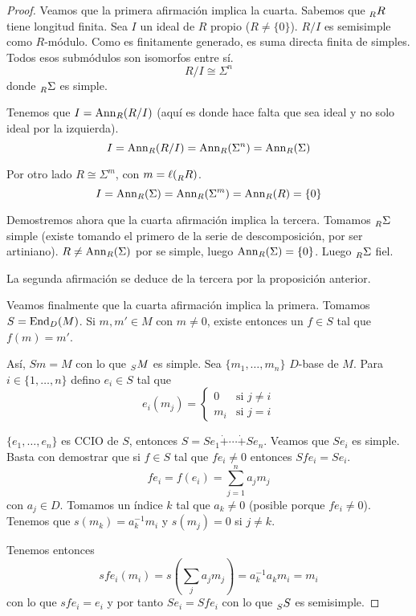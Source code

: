 \begin{proof}
  Veamos que la primera afirmación implica la cuarta.
  Sabemos que \(\prescript{}{R}{R}\) tiene longitud finita.
  Sea \(I\) un ideal de \(R\) propio (\(R\neq \{0\}\)).
  \(R/I\) es semisimple como \(R\)-módulo. Como es finitamente generado,
  es suma directa finita de simples. Todos esos submódulos son isomorfos
  entre sí.
  \[
    R/I\cong \Sigma^n
  \]
  donde \(\prescript{}{R}{\Sigma}\) es simple.

  Tenemos que \(I=\operatorname{Ann}_R(R/I)\) (aquí es donde hace falta que sea ideal y no
  solo ideal por la izquierda).
  \[
    I=\operatorname{Ann}_R(R/I)=\operatorname{Ann}_R(\Sigma^n)=\operatorname{Ann}_R(\Sigma)
  \]

  Por otro lado \(R\cong\Sigma^m\), con  \(m=\ell(\prescript{}{R}{R})\).
  \[
    I=\operatorname{Ann}_R(\Sigma)=\operatorname{Ann}_R(\Sigma^m)=\operatorname{Ann}_R(R)=\{0\}
  \]

  Demostremos ahora que la cuarta afirmación implica la tercera.
  Tomamos \(\prescript{}{R}{\Sigma}\) simple (existe tomando el primero
  de la serie de descomposición, por ser artiniano).
  \(R\neq\operatorname{Ann}_R(\Sigma)\) por se simple, luego \(\operatorname{Ann}_R(\Sigma)=\{0\}\).
  Luego \(\prescript{}{R}{\Sigma}\) fiel.

  La segunda afirmación se deduce de la tercera por la proposición anterior.

  Veamos finalmente que la cuarta afirmación implica la primera. Tomamos
  \(S=\operatorname{End}_D(M)\). Si \(m, m'\in M\) con \(m\neq 0\), existe entonces un
  \(f\in S\) tal que \(f(m)=m'\).

  Así, \(Sm=M\) con lo que \(\prescript{}{S}{M}\) es simple.
  Sea \(\{m_1,\ldots, m_n\}\) \(D\)-base de \(M\). Para \(i\in\{1,\ldots,n\}\)
  defino \(e_i\in S\) tal que
  \[
    e_i(m_j)=
    \left\{
    \begin{matrix}
      0&\textrm{si } j\neq i\\
      m_i&\textrm{si } j = i
    \end{matrix}
    \right.
  \]

  \(\{e_1,\ldots,e_n\}\) es CCIO de \(S\), entonces \(S=Se_1\dot{+}
  \cdots\dot{+}Se_n\).
  Veamos que \(Se_i\) es simple. Basta con demostrar que si \(f\in S\)
  tal que \(fe_i\neq 0\) entonces \(Sfe_i=Se_i\).
  \[
    fe_i=f(e_i)=\sum_{j=1}^n a_j m_j
  \]
  con \(a_j\in D\). Tomamos un índice \(k\) tal que \(a_k\neq 0\) (posible
  porque \(fe_i\neq 0\)). Tenemos que \(s(m_k)=a_k^{-1} m_i\) y
  \(s(m_j)=0\) si \(j\neq k\).

  Tenemos entonces
  \[
    sfe_i(m_i)=s(\sum_j a_j m_j)=a_k^{-1}a_k m_i=m_i
  \]
  con lo que \(sfe_i=e_i\) y por tanto \(Se_i=Sfe_i\) con lo que
  \(\prescript{}{S}{S}\) es semisimple.

\end{proof}


